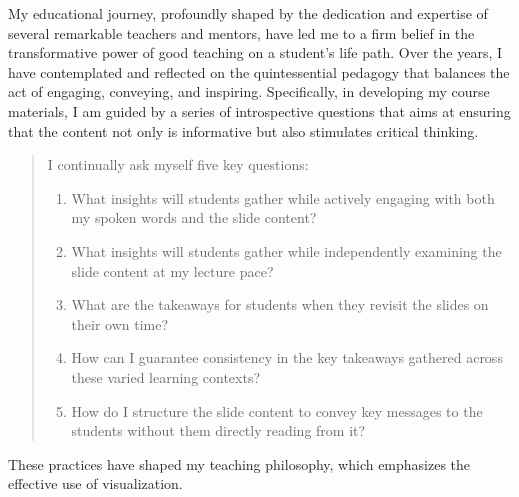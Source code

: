 My educational journey, profoundly shaped by the dedication and expertise of several remarkable teachers and mentors, have led me to a firm belief in the transformative power of good teaching on a student's life path. Over the years, I have contemplated and reflected on the quintessential pedagogy that balances the act of engaging, conveying, and inspiring. Specifically, in developing my course materials, I am guided by a series of introspective questions that aims at ensuring that the content not only is informative but also stimulates critical thinking.
\begin{quote}
    I continually ask myself five key questions:
    \begin{enumerate}[nosep,leftmargin=*]
        \item What insights will students gather while actively engaging with both my spoken words and the slide content?
        \item What insights will students gather while independently examining the slide content at my lecture pace?
        \item What are the takeaways for students when they revisit the slides on their own time?
        \item How can I guarantee consistency in the key takeaways gathered across these varied learning contexts?
        \item How do I structure the slide content to convey key messages to the students without them directly reading from it?
    \end{enumerate}
\end{quote}
These practices have shaped my teaching philosophy, which emphasizes the effective use of visualization.

